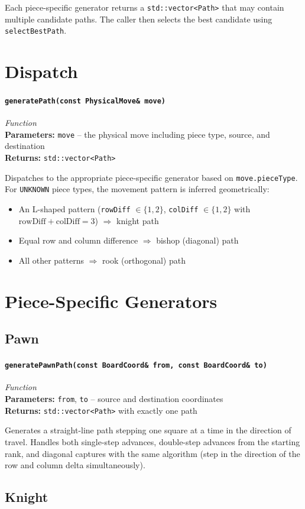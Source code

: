 \documentclass[11pt,a4paper]{report}
\newcommand{\function}[4]{%
    \paragraph{\texttt{#1}} \hfill \textit{#2}\\
    \textbf{Parameters:} #3\\
    \textbf{Returns:} #4
}
\begin{document}
Each piece-specific generator returns a \texttt{std::vector<Path>} that may contain multiple candidate paths. The caller then selects the best candidate using \texttt{selectBestPath}.

\section{Dispatch}

\function{generatePath(const PhysicalMove\& move)}{Function}{\texttt{move} -- the physical move including piece type, source, and destination}{\texttt{std::vector<Path>}}

Dispatches to the appropriate piece-specific generator based on \texttt{move.pieceType}. For \texttt{UNKNOWN} piece types, the movement pattern is inferred geometrically:

\begin{itemize}[noitemsep]
    \item An L-shaped pattern (\texttt{rowDiff} $\in \{1,2\}$, \texttt{colDiff} $\in \{1,2\}$ with $\text{rowDiff}+\text{colDiff}=3$) $\Rightarrow$ knight path
    \item Equal row and column difference $\Rightarrow$ bishop (diagonal) path
    \item All other patterns $\Rightarrow$ rook (orthogonal) path
\end{itemize}

\section{Piece-Specific Generators}

\subsection{Pawn}

\function{generatePawnPath(const BoardCoord\& from, const BoardCoord\& to)}{Function}{\texttt{from}, \texttt{to} -- source and destination coordinates}{\texttt{std::vector<Path>} with exactly one path}

Generates a straight-line path stepping one square at a time in the direction of travel. Handles both single-step advances, double-step advances from the starting rank, and diagonal captures with the same algorithm (step in the direction of the row and column delta simultaneously).

\subsection{Knight}
\end{document}
